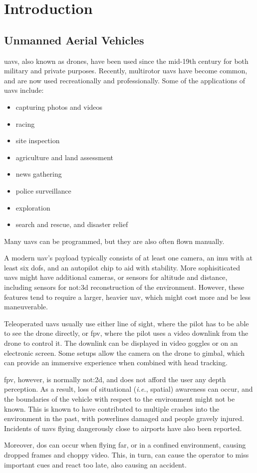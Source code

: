 \chapter{Introduction}
\section{Unmanned Aerial Vehicles}
\Glspl{uav}, also known as drones, have been used since the mid-19th century for both military and private purposes.
Recently, multirotor \glspl{uav} have become common, and are now used recreationally and professionally.
Some of the applications of \glspl{uav} include:

\begin{itemize}
  \item capturing photos and videos
  \item racing
  \item site inspection
  \item agriculture and land assessment
  \item news gathering
  \item police surveillance
  \item exploration
  \item search and rescue, and disaster relief
\end{itemize}

Many \glspl{uav} can be programmed, but they are also often flown manually.

A modern \gls{uav}'s payload typically consists of at least one camera, an \gls{imu} with at least six \glspl{dof}, and an autopilot chip to aid with stability.
More sophisiticated \glspl{uav} might have additional cameras, or sensors for altitude and distance, including sensors for \gls{not:3d} reconstruction of the environment.
However, these features tend to require a larger, heavier \gls{uav}, which might cost more and be less maneuverable.

Teleoperated \glspl{uav} usually use either line of sight, where the pilot has to be able to see the drone directly, or \gls{fpv}, where the pilot uses a video downlink from the drone to control it.
The downlink can be displayed in video goggles or on an electronic screen.
Some setups allow the camera on the drone to gimbal, which can provide an immersive experience when combined with head tracking.

\gls{fpv}, however, is normally \gls{not:2d}, and does not afford the user any depth perception.
As a result, loss of situational (\emph{i.e.}, spatial) awareness can occur, and the boundaries of the vehicle with respect to the environment might not be known.
This is known to have contributed to multiple crashes into the environment in the past, with powerlines damaged and people gravely injured.
Incidents of \glspl{uav} flying dangerously close to airports have also been reported.

Moreover, \gls{dos} can occur when flying far, or in a confined environment, causing dropped frames and choppy video.
This, in turn, can cause the operator to miss important cues and react too late, also causing an accident.
